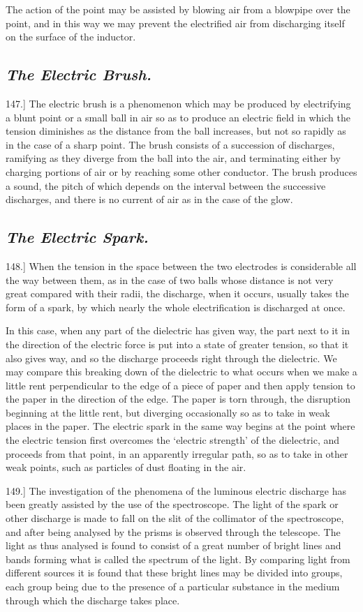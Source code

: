 \documentclass[12pt,oneside]{book}[2021/10/04]
\newcommand{\Heading}{\centering\normalfont}
\newcommand{\Subsection}[1]{\subsection*{\normalsize\Heading\itshape #1}}
\newcommand{\Runhead}[1]{\fancyhead[C]{\iffloatpage{}{\small#1}}}
\newcommand{\article}[1]{\phantomsection \label{art:#1}{#1.]}}
\newcommand{\¬}{\hphantom{0}}
\begin{document}
The action of the point may be assisted by blowing air from
a blowpipe over the point, and in this way we may prevent the
electrified air from discharging itself on the surface of the inductor.

\Subsection{The Electric Brush.}

\article{147} The electric brush is a phenomenon which may be produced
by electrifying a blunt point or a small ball in air so as to
produce an electric field in which the tension diminishes as the
distance from the ball increases, but not so rapidly as in the case of
a sharp point. The brush consists of a succession of discharges,
ramifying as they diverge from the ball into the air, and terminating
either by charging portions of air or by reaching some other
conductor. The brush produces a sound, the pitch of which depends
on the interval between the successive discharges, and there is no
current of air as in the case of the glow.

\Subsection{The Electric Spark.}

\article{148} When the tension in the space between the two electrodes
is considerable all the way between them, as in the case of two balls
whose distance is not very great compared with their radii, the
discharge, when it occurs, usually takes the form of a spark, by
which nearly the whole electrification is discharged at once.
\Runhead{DISRUPTIVE DISCHARGE.}

In this case, when any part of the dielectric has given way, the
part next to it in the direction of the electric force is put into
a state of greater tension, so that it also gives way, and so the
discharge proceeds right through the dielectric. We may compare
this breaking down of the dielectric to what occurs when we make
a little rent perpendicular to the edge of a piece of paper and then
apply tension to the paper in the direction of the edge. The paper
is torn through, the disruption beginning at the little rent, but
diverging occasionally so as to take in weak places in the paper.
The electric spark in the same way begins at the point where the
electric tension first overcomes the `electric strength' of the dielectric,
and proceeds from that point, in an apparently irregular path,
so as to take in other weak points, such as particles of dust floating
in the air.

\article{149} The investigation of the phenomena of the luminous
electric discharge has been greatly assisted by the use of the spectroscope.
The light of the spark or other discharge is made to fall
on the slit of the collimator of the spectroscope, and after being
analysed by the prisms is observed through the telescope. The
light as thus analysed is found to consist of a great number of
bright lines and bands forming what is called the spectrum of the
light. By comparing light from different sources it is found that
these bright lines may be divided into groups, each group being
due to the presence of a particular substance in the medium through
which the discharge takes place.
\end{document}
